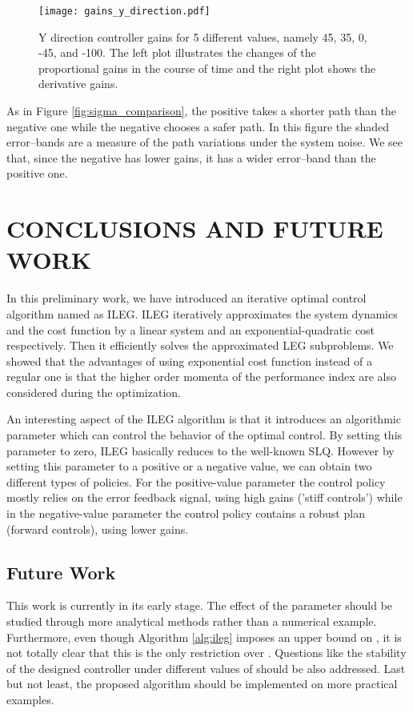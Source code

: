 \documentclass[letterpaper, 10 pt, conference]{ieeeconf}
\begin{document}
\begin{figure} [tpb]
\centering
\texttt{[image: gains\_y\_direction.pdf]}
\caption{Y direction controller gains for 5 different  values, namely 45, 35, 0, -45, and -100. The left plot illustrates the changes of the proportional gains in the course of time and the right plot shows the derivative gains.}
\label{fig:gains_y_direction}
\end{figure}

As in Figure \ref{fig:sigma_comparison}, the positive  takes a shorter
path than the negative one while the negative  chooses a safer path. In
this figure the shaded error--bands are a measure of the path variations under the
system noise. We see that, since the negative  has lower gains, it has a
wider error--band than the positive one.

\section{CONCLUSIONS AND FUTURE WORK}
In this preliminary work, we have introduced an iterative optimal control
algorithm named as ILEG. ILEG iteratively approximates the system dynamics and
the cost function by a linear system and an exponential-quadratic cost
respectively. Then it efficiently solves the approximated LEG subproblems. We
showed that the advantages of using exponential cost function instead of a
regular one is that the higher order momenta of the performance index are also
considered during the optimization.
  
An interesting aspect of the ILEG algorithm is that it introduces an algorithmic
parameter which can control the behavior of the optimal control. By setting this
parameter to zero, ILEG basically reduces to the well-known SLQ. However by
setting this parameter to a positive or a negative value, we can obtain two
different types of policies. For the positive-value parameter the control policy
mostly relies on the error feedback signal, using high gains ('stiff controls')
while in the negative-value parameter the control policy contains a robust plan
(forward controls), using lower gains.

\subsection{Future Work}
This work is currently in its early stage. The effect of the  parameter
should be studied through more analytical methods rather than a numerical
example. Furthermore, even though Algorithm \ref{alg:ileg} imposes an upper bound
on , it is not totally clear that this is the only restriction over
. Questions like the stability of the designed controller under different
values of  should be also addressed. Last but not least, the proposed
algorithm should be implemented on more practical examples.
\end{document}
